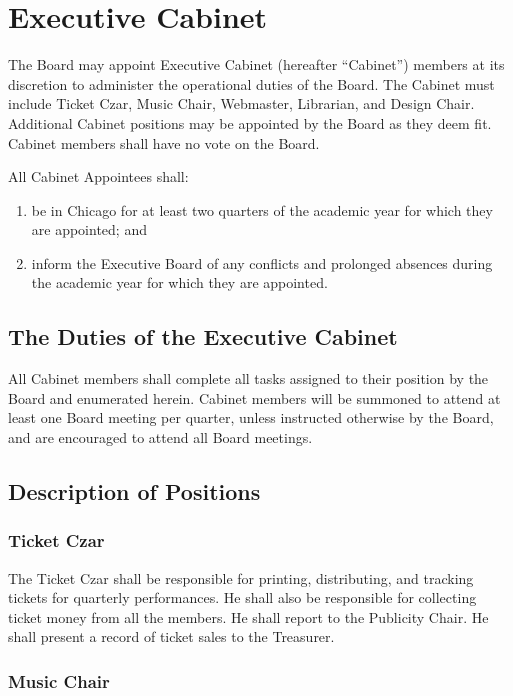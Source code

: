 \documentclass{article}
\begin{document}
\section{Executive Cabinet}

The Board may appoint Executive Cabinet (hereafter ``Cabinet'') members at its
discretion to administer the operational duties of the Board. The Cabinet must
include Ticket Czar, Music Chair, Webmaster, Librarian, and Design
Chair. Additional Cabinet positions may be appointed by the Board as they deem
fit. Cabinet members shall have no vote on the Board.

All Cabinet Appointees shall:
\begin{enumerate}
\item be in Chicago for at least two quarters of the academic year for which
they are appointed; and
\item inform the Executive Board of any conflicts and prolonged absences
during the academic year for which they are appointed.
\end{enumerate}

\subsection{The Duties of the Executive Cabinet}

All Cabinet members shall complete all tasks assigned to their position by the
Board and enumerated herein. Cabinet members will be summoned to
attend at least one Board meeting per quarter, unless instructed
otherwise by the Board, and are encouraged to attend all
Board meetings.

\subsection{Description of Positions}


\subsubsection{Ticket Czar}

The Ticket Czar shall be responsible for printing, distributing, and
tracking tickets for quarterly performances. He shall also be responsible
for collecting ticket money from all the members. He shall report
to the Publicity Chair. He shall present a record of ticket sales
to the Treasurer.


\subsubsection{Music Chair}
\end{document}
